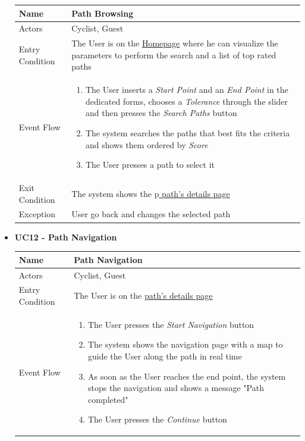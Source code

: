 \begin{itemize}
\noindent
\begin{tabular}{|p{7cm}|p{7cm}|}
\hline
Name            & Path Browsing \\ \hline
Actors          & Cyclist, Guest \\ \hline
Entry Condition & The User is on the \hyperref[fig:Homepage]{Homepage} where he can visualize the parameters to perform the search and a list of top rated paths \\ \hline
Event Flow      &
\begin{enumerate}
    \item The User inserts a \textit{Start Point} and an \textit{End Point} in the dedicated forms, chooses a \textit{Tolerance} through the slider and then presses the \textit{Search Paths} button
    \item The system searches the paths that best fits the criteria and shows them ordered by \textit{Score}
    \item The User presses a path to select it
\end{enumerate}
\\ \hline
Exit Condition  & The system shows the p\hyperref[fig:Inventory]{ path's details page} \\ \hline
Exception       & User go back and changes the selected path
\\ \hline
\end{tabular}
\newpage
\item \textbf{UC12 - Path Navigation}\par\smallskip
\noindent
\begin{tabular}{|p{7cm}|p{7cm}|}
\hline
Name            & Path Navigation \\ \hline
Actors          & Cyclist, Guest \\ \hline
Entry Condition & The User is on the \hyperref[fig:Inventory]{path's details page} \\ \hline
Event Flow      & 
\begin{enumerate}
    \item The User presses the \textit{Start Navigation} button
    \item The system shows the navigation page with a map to guide the User along the path in real time
    \item As soon as the User reaches the end point, the system stops the navigation and shows a message "Path completed"
    \item The User presses the \textit{Continue} button
\end{enumerate}
\\ \hline

\end{tabular}
\end{itemize}
